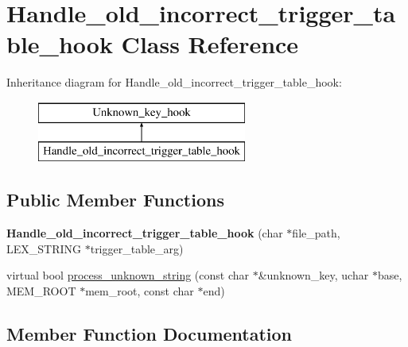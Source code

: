 \hypertarget{classHandle__old__incorrect__trigger__table__hook}{}\section{Handle\+\_\+old\+\_\+incorrect\+\_\+trigger\+\_\+table\+\_\+hook Class Reference}
\label{classHandle__old__incorrect__trigger__table__hook}
Inheritance diagram for Handle\+\_\+old\+\_\+incorrect\+\_\+trigger\+\_\+table\+\_\+hook\+:\begin{figure}[H]
\begin{center}
\leavevmode
\includegraphics[height=2.000000cm]{classHandle__old__incorrect__trigger__table__hook}
\end{center}
\end{figure}
\subsection*{Public Member Functions}
\begin{DoxyCompactItemize}
\item 
\mbox{\label{classHandle__old__incorrect__trigger__table__hook_aa5230426bdb5243bcacded18324c0853}} 
{\bfseries Handle\+\_\+old\+\_\+incorrect\+\_\+trigger\+\_\+table\+\_\+hook} (char $\ast$file\+\_\+path, L\+E\+X\+\_\+\+S\+T\+R\+I\+NG $\ast$trigger\+\_\+table\+\_\+arg)
\item 
virtual bool \mbox{\hyperlink{classHandle__old__incorrect__trigger__table__hook_a15f601c70e4e9d04d83a1ee8b04eeae1}{process\+\_\+unknown\+\_\+string}} (const char $\ast$\&unknown\+\_\+key, uchar $\ast$base, M\+E\+M\+\_\+\+R\+O\+OT $\ast$mem\+\_\+root, const char $\ast$end)
\end{DoxyCompactItemize}


\subsection{Member Function Documentation}
\mbox{\label{classHandle__old__incorrect__trigger__table__hook_a15f601c70e4e9d04d83a1ee8b04eeae1}} 
